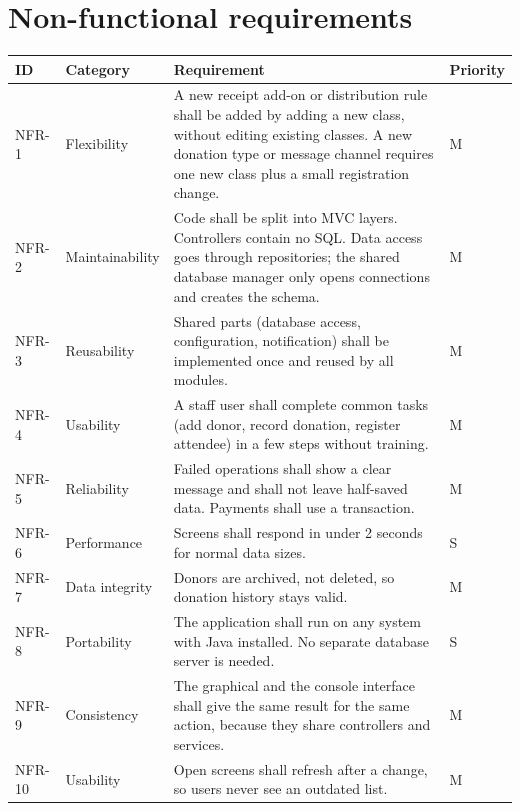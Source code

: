\section{Non-functional requirements}

\begin{center}
\small
\begin{tabularx}{\textwidth}{@{}L{0.09\textwidth}L{0.20\textwidth}YL{0.11\textwidth}@{}}
\toprule
\textbf{ID} & \textbf{Category} & \textbf{Requirement} & \textbf{Priority} \\
\midrule
NFR-1 & Flexibility & A new receipt add-on or distribution rule shall be added by adding a new class, without editing existing classes. A new donation type or message channel requires one new class plus a small registration change. & M \\
NFR-2 & Maintainability & Code shall be split into MVC layers. Controllers contain no SQL. Data access goes through repositories; the shared database manager only opens connections and creates the schema. & M \\
NFR-3 & Reusability & Shared parts (database access, configuration, notification) shall be implemented once and reused by all modules. & M \\
NFR-4 & Usability & A staff user shall complete common tasks (add donor, record donation, register attendee) in a few steps without training. & M \\
NFR-5 & Reliability & Failed operations shall show a clear message and shall not leave half-saved data. Payments shall use a transaction. & M \\
NFR-6 & Performance & Screens shall respond in under 2 seconds for normal data sizes. & S \\
NFR-7 & Data integrity & Donors are archived, not deleted, so donation history stays valid. & M \\
NFR-8 & Portability & The application shall run on any system with Java installed. No separate database server is needed. & S \\
NFR-9 & Consistency & The graphical and the console interface shall give the same result for the same action, because they share controllers and services. & M \\
NFR-10 & Usability & Open screens shall refresh after a change, so users never see an outdated list. & M \\
\bottomrule
\end{tabularx}
\end{center}
